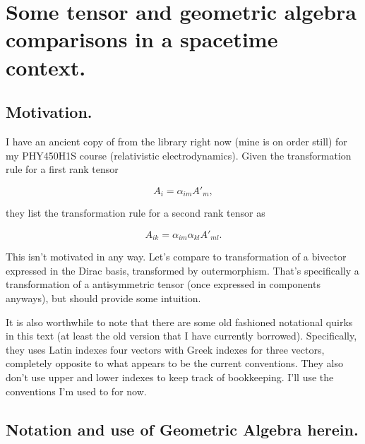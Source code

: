 
%

\chapter{Some tensor and geometric algebra comparisons in a spacetime context.}
\label{chap:antisymmetricTensorTx}
{}
\date{Jan 14, 2011}

\beginArtWithToc

\section{Motivation.}

I have an ancient copy of \cite{landau1980classical} from the library right now (mine is on order still) for my PHY450H1S course (relativistic electrodynamics).  Given the transformation rule for a first rank tensor

\begin{equation}\label{eqn:antisymmetricTensorTx:5}
A_{i} = \alpha_{im} A'_{m},
\end{equation}

they list the transformation rule for a second rank tensor as

\begin{equation}\label{eqn:antisymmetricTensorTx:10}
A_{ik} = \alpha_{im} \alpha_{kl} A'_{ml}.
\end{equation}

This isn't motivated in any way.  Let's compare to transformation of a bivector expressed in the Dirac basis, transformed by outermorphism.  That's specifically a transformation of a antisymmetric tensor (once expressed in components anyways), but should provide some intuition.

It is also worthwhile to note that there are some old fashioned notational quirks in this text (at least the old version that I have currently borrowed).  Specifically, they uses Latin indexes four vectors with Greek indexes for three vectors, completely opposite to what appears to be the current conventions.  They also don't use upper and lower indexes to keep track of bookkeeping.  I'll use the conventions I'm used to for now.

\section{Notation and use of Geometric Algebra herein.}

